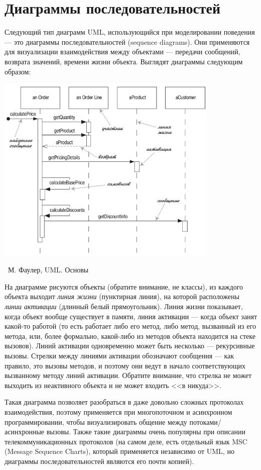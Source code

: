 \documentclass[a5paper]{article}
\newcommand{\attribution}[1] {
    \vspace{-5mm}\begin{flushright}\begin{scriptsize}%
    {\textcopyright\, #1}\end{scriptsize}\end{flushright}
}
\begin{document}
\section{Диаграммы последовательностей}

Следующий тип диаграмм UML, использующийся при моделировании поведения --- это диаграммы последовательностей (sequence diagrams). Они применяются для визуализации взаимодействия между объектами --- передачи сообщений, возврата значений, времени жизни объекта. Выглядят диаграммы следующим образом:

\begin{center}
    \includegraphics[width=0.8\textwidth]{sequenceDiagramSyntax.png}
    \attribution{М. Фаулер, UML. Основы}
\end{center}

На диаграмме рисуются объекты (обратите внимание, не классы), из каждого объекта выходит \textit{линия жизни} (пунктирная линия), на которой расположены \textit{линии активации} (длинный белый прямоугольник). Линия жизни показывает, когда объект вообще существует в памяти, линия активации --- когда объект занят какой-то работой (то есть работает либо его метод, либо метод, вызванный из его метода, или, более формально, какой-либо из методов объекта находится на стеке вызовов). Линий активации одновременно может быть несколько --- рекурсивные вызовы. Стрелки между линиями активации обозначают сообщения --- как правило, это вызовы методов, и поэтому они ведут в начало соответствующих вызванному методу линий активации. Обратите внимание, что стрелка не может выходить из неактивного объекта и не может входить <<в никуда>>.

Такая диаграмма позволяет разобраться в даже довольно сложных протоколах взаимодействия, поэтому применяется при многопоточном и асинхронном программировании, чтобы визуализировать общение между потоками/асинхронные вызовы. Также такие диаграммы очень популярны при описании телекоммуникационных протоколов (на самом деле, есть отдельный язык MSC (Message Sequence Charts), который применяется независимо от UML, но диаграммы последовательностей являются его почти копией).
\end{document}
